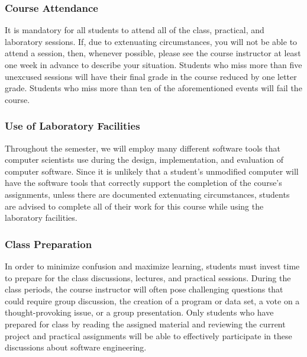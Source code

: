 \documentclass[11pt]{article}
\begin{document}
\vspace*{-.1in}

\subsubsection*{Course Attendance}

It is mandatory for all students to attend all of the class, practical, and
laboratory sessions. If, due to extenuating circumstances, you will not be able
to attend a session, then, whenever possible, please see the course instructor
at least one week in advance to describe your situation. Students who miss more
than five unexcused sessions will have their final grade in the course reduced
by one letter grade. Students who miss more than ten of the aforementioned
events will fail the course.

\vspace*{-.05in}

\subsubsection*{Use of Laboratory Facilities}

Throughout the semester, we will employ many different software tools that
computer scientists use during the design, implementation, and evaluation of
computer software. Since it is unlikely that a student's unmodified computer
will have the software tools that correctly support the completion of the
course's assignments, unless there are documented extenuating circumstances,
students are advised to complete all of their work for this course while using
the laboratory facilities.

\vspace*{-.1in}

\subsubsection*{Class Preparation}

In order to minimize confusion and maximize learning, students must invest time
to prepare for the class discussions, lectures, and practical sessions. During
the class periods, the course instructor will often pose challenging questions
that could require group discussion, the creation of a program or data set, a
vote on a thought-provoking issue, or a group presentation. Only students who
have prepared for class by reading the assigned material and reviewing the
current project and practical assignments will be able to effectively
participate in these discussions about software engineering.
\end{document}
